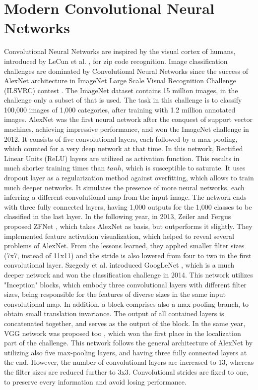 \section{Modern Convolutional Neural Networks}\label{s:convnets}
Convolutional Neural Networks are inspired by the visual cortex of humans,  introduced by LeCun et al. \cite{LeCun:1989:BAH:1351079.1351090}, for zip code recognition. Image classification challenges are dominated by Convolutional Neural Networks since the success of AlexNet architecture \cite{NIPS2012_4824} in ImageNet Large Scale Visual Recognition Challenge (ILSVRC) contest \cite{ILSVRC15}. The ImageNet dataset contains 15 million images, in the challenge only a subset of that is used. The task in this challenge is to classify 100,000 images of 1,000 categories, after training with 1.2 million annotated images.
\bigbreak
AlexNet was the first neural network after the conquest of support vector machines, achieving impressive performance, and won the ImageNet challenge in 2012. It consists of five convolutional layers, each followed by a max-pooling, which counted for a very deep network at that time. In this network, Rectified Linear Units (ReLU) layers are utilized as activation function. This results in much shorter training times than $\mathit{tanh}$, which is susceptible to saturate. It uses dropout layer \cite{journals/corr/abs-1207-0580} as a regularization method against overfitting, which allows to train much deeper networks. It simulates the presence of more neural networks, each inferring a different convolutional map from the input image. The network ends with three fully connected layers, having 1,000 outputs for the 1,000 classes to be classified in the last layer.
\bigbreak
In the following year, in 2013, Zeiler and Fergus proposed ZFNet \cite{DBLP:journals/corr/ZeilerF13}, which takes AlexNet as basis, but outperforms it slightly. They implemented feature activation visualization, which helped to reveal several problems of AlexNet. From the lessons learned, they applied smaller filter sizes (7x7, instead of 11x11) and the stride is also lowered from four to two in the first convolutional layer. 
\bigbreak
Szegedy et al. introduced GoogLeNet \cite{DBLP:journals/corr/SzegedyLJSRAEVR14}, which is a much deeper network and won the classification challenge in 2014. This network utilizes "Inception" blocks, which embody three convolutional layers with different filter sizes, being responsible for the features of diverse sizes in the same input convolutional map. In addition, a block comprises also a max pooling branch, to obtain small translation invariance. The output of all contained layers is concatenated together, and serves as the output of the block. In the same year, VGG network was proposed too \cite{Simonyan14c}, which won the first place in the localization part of the challenge. This network follows the general architecture of AlexNet by utilizing also five max-pooling layers, and having three fully connected layers at the end. However, the number of convolutional layers are increased to 13, whereas the filter sizes are reduced further to 3x3. Convolutional strides are fixed to one, to preserve every information and avoid losing performance.
